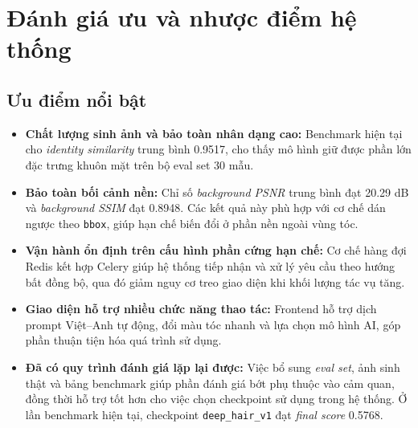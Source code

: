 \documentclass[../main.tex]{subfiles}
\begin{document}
\section{Đánh giá ưu và nhược điểm hệ thống}

\subsection{Ưu điểm nổi bật}
\begin{itemize}
    \item \textbf{Chất lượng sinh ảnh và bảo toàn nhân dạng cao:} Benchmark hiện tại cho \textit{identity similarity} trung bình 0.9517, cho thấy mô hình giữ được phần lớn đặc trưng khuôn mặt trên bộ eval set 30 mẫu.
    \item \textbf{Bảo toàn bối cảnh nền:} Chỉ số \textit{background PSNR} trung bình đạt 20.29 dB và \textit{background SSIM} đạt 0.8948. Các kết quả này phù hợp với cơ chế dán ngược theo \texttt{bbox}, giúp hạn chế biến đổi ở phần nền ngoài vùng tóc.
    \item \textbf{Vận hành ổn định trên cấu hình phần cứng hạn chế:} Cơ chế hàng đợi Redis kết hợp Celery giúp hệ thống tiếp nhận và xử lý yêu cầu theo hướng bất đồng bộ, qua đó giảm nguy cơ treo giao diện khi khối lượng tác vụ tăng.
    \item \textbf{Giao diện hỗ trợ nhiều chức năng thao tác:} Frontend hỗ trợ dịch prompt Việt--Anh tự động, đổi màu tóc nhanh và lựa chọn mô hình AI, góp phần thuận tiện hóa quá trình sử dụng.
    \item \textbf{Đã có quy trình đánh giá lặp lại được:} Việc bổ sung \textit{eval set}, ảnh sinh thật và bảng benchmark giúp phần đánh giá bớt phụ thuộc vào cảm quan, đồng thời hỗ trợ tốt hơn cho việc chọn checkpoint sử dụng trong hệ thống. Ở lần benchmark hiện tại, checkpoint \texttt{deep\_hair\_v1} đạt \textit{final score} 0.5768.
\end{itemize}
\end{document}
